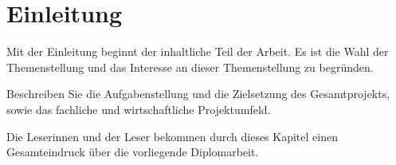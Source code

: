 \chapter{Einleitung}\label{sec:introduction}

Mit der Einleitung beginnt der inhaltliche Teil der Arbeit. Es ist die Wahl der Themenstellung und das Interesse an dieser Themenstellung zu begründen. 

Beschreiben Sie die Aufgabenstellung und die Zielsetzung des Gesamtprojekts, sowie das fachliche und wirtschaftliche Projektumfeld.

Die Leserinnen und der Leser bekommen durch dieses Kapitel einen Gesamteindruck über die vorliegende Diplomarbeit.
